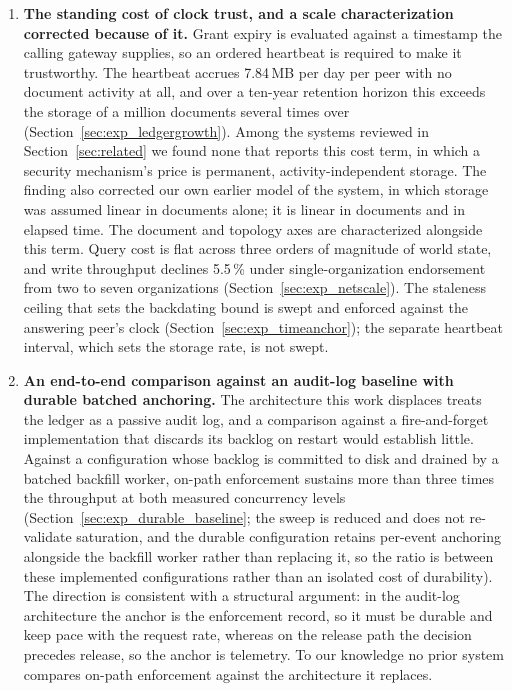 \documentclass[preprint,12pt]{elsarticle}
\begin{document}
\begin{enumerate}
\item \textbf{The standing cost of clock trust, and a scale characterization
corrected because of it.} Grant expiry is evaluated against a timestamp the
calling gateway supplies, so an ordered heartbeat is required to make it
trustworthy. The heartbeat accrues 7.84\,MB per day per peer with no document
activity at all, and over a ten-year retention horizon this exceeds the storage
of a million documents several times over
(Section~\ref{sec:exp_ledgergrowth}). Among the systems reviewed in
Section~\ref{sec:related} we found none that reports this cost term, in which a
security mechanism's price is permanent, activity-independent storage. The
finding also corrected our own earlier model of the system, in which storage was
assumed linear in documents alone; it is linear in documents and in elapsed
time. The document and topology axes are characterized alongside this term.
Query cost is flat across three orders of magnitude of world state, and write
throughput declines 5.5\,\% under single-organization endorsement from two to
seven organizations (Section~\ref{sec:exp_netscale}). The staleness ceiling that
sets the backdating bound is swept and enforced against the answering peer's
clock (Section~\ref{sec:exp_timeanchor}); the separate heartbeat interval, which
sets the storage rate, is not swept.

\item \textbf{An end-to-end comparison against an audit-log baseline with
durable batched anchoring.} The architecture this work displaces treats the
ledger as a passive audit log, and a comparison against a fire-and-forget
implementation that discards its backlog on restart would establish little. Against
a configuration whose backlog is committed to disk and drained by a batched
backfill worker, on-path enforcement sustains more than three times the
throughput at both measured concurrency levels
(Section~\ref{sec:exp_durable_baseline}; the sweep is reduced and does not
re-validate saturation, and the durable configuration retains per-event
anchoring alongside the backfill worker rather than replacing it, so the ratio
is between these implemented configurations rather than an isolated cost of
durability). The direction is consistent with a structural argument: in the
audit-log architecture the anchor is the enforcement record, so it must be
durable and keep pace with the request rate, whereas on the release path the
decision precedes release, so the anchor is telemetry. To our
knowledge no prior system compares on-path enforcement against the architecture
it replaces.

\end{enumerate}
\end{document}
